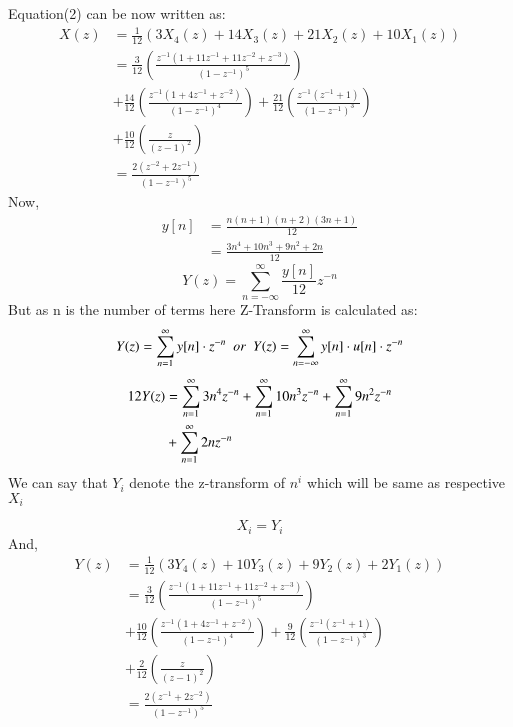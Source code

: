 \documentclass[journal,12pt,twocolumn]{IEEEtran}
\theoremstyle{remark}
\begin{document}
Equation(2) can be now written as:\\
\begin{align*}
    X(z) &=\frac{1}{12}(3X_4(z) + 14X_3(z) + 21X_2(z) + 10X_1(z)) \\
         &= \frac{3}{12}\left(\frac{z^{-1}(1+11z^{-1}+11z^{-2}+z^{-3})}{(1-z^{-1})^5}\right)\\ &+ \frac{14}{12}\left(\frac{z^{-1}(1+4z^{-1}+z^{-2})}{(1-z^{-1})^4}\right) 
         + \frac{21}{12}\left(\frac{z^{-1}(z^{-1}+1)}{(1-z^{-1})^3}\right)\\ &+ \frac{10}{12}\left(\frac{z}{(z - 1)^2}\right) \\
         &= \frac{2(z^{-2}+2z^{-1})}{(1-z^{-1})^5}
\end{align*}
Now,
\begin{align*}
    y[n] &= \frac{n(n+1)(n+2)(3n+1)}{12}\\
         &= \frac{3n^4 + 10n^3 + 9n^2 + 2n}{12}\
\end{align*}
\begin{equation}
    Y(z) = \sum_{n=-\infty}^\infty \frac{y[n]}{12}z^{-n}
\end{equation}
But as n is the number of terms here Z-Transform is calculated as:
\begin{equation}
    Y(z) = \sum_{n=1}^\infty y[n]\cdot z^{-n} \hspace{5pt} or \hspace{5pt}   Y(z) = \sum_{n=-\infty}^\infty y[n]\cdot u[n]\cdot z^{-n}\notag
\end{equation}
\begin{align}
    12Y(z) &= \sum_{n=1}^\infty 3n^4z^{-n} +  \sum_{n=1}^\infty 10n^3z^{-n} +  \sum_{n=1}^\infty 9n^2 z^{-n}\\   &+\sum_{n=1}^\infty 2nz^{-n}\notag
\end{align}
We can say that $Y_i$ denote the z-transform of $n^{i}$ which will be same as respective $X_i$ 

$$X_i=Y_i$$
\newpage
And,
\begin{align*}
    Y(z) &=\frac{1}{12}(3Y_4(z) + 10Y_3(z) + 9Y_2(z) + 2Y_1(z)) \\
         &= \frac{3}{12}\left(\frac{z^{-1}(1+11z^{-1}+11z^{-2}+z^{-3})}{(1-z^{-1})^5}\right)\\ &+ \frac{10}{12}\left(\frac{z^{-1}(1+4z^{-1}+z^{-2})}{(1-z^{-1})^4}\right) 
         + \frac{9}{12}\left(\frac{z^{-1}(z^{-1}+1)}{(1-z^{-1})^3}\right)\\ &+ \frac{2}{12}\left(\frac{z}{(z - 1)^2}\right) \\
         &= \frac{2(z^{-1}+2z^{-2})}{(1-z^{-1})^5}
\end{align*}
\end{document}
